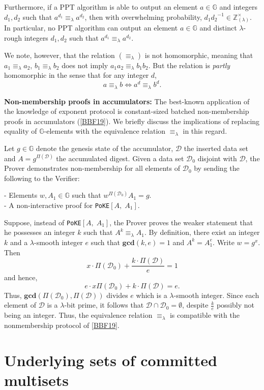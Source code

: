 \documentclass[11pt, lettersize, notitlepage, leqno, footskip=0.6cm]{article}
\newcommand{\bz}{\mathbb Z}
\newcommand{\LRA}{\Longleftrightarrow}
\newcommand{\eqlam}{\equiv_{\lam}}
\newcommand{\mc}{\mathcal}
\newcommand{\mb}{\mathbb}
\newcommand{\mbf}{\mathbf}
\newcommand{\lam}{\lambda}
\newcommand{\bzlam}{\bz_{(\lam)}}
\newcommand{\vs}{\vspace{-0.15cm}}
\newcommand{\noin}{\noindent}
\newcommand{\op}{overwhelming probability}
\newcommand{\GCD}{\mbf{gcd}}
\numberwithin{equation}{section}
\begin{document}
{{{Furthermore, if a PPT algorithm is able to output an element $a\in\mb{G}$ and integers $d_1,d_2$ such that $a^{d_1}\eqlam a^{d_2}$, then with \op, ${d_1}{d_2}^{-1}\in\bzlam^{\times}$. In particular, no PPT algorithm can output an element $a\in \mb{G}$ and distinct $\lam$-rough integers $d_1,d_2$ such that $a^{d_1}\eqlam a^{d_2}$.

We note, however, that the relation $(\equiv_{\lam})$ is not homomorphic, meaning that $a_1 \equiv_{\lam} a_2$, $b_1 \equiv_{\lam} b_2$ does not imply $a_1a_2 \eqlam b_1b_2$. But the relation is \textit{partly} homomorphic in the sense that for any integer $d$, \vs $$ a \equiv_{\lam} b \LRA a^d \equiv_{\lam} b^d .$$ 


\noin \textbf{Non-membership proofs in accumulators:} The  best-known application of the knowledge of exponent protocol is constant-sized batched non-membership proofs in accumulators (\hyperlink{BBF19}{[BBF19]}). We briefly discuss the implications of replacing equality of $\mb{G}$-elements with the equivalence relation $\eqlam$ in this regard. 

Let $g \in \mb{G}$ denote the genesis state of the accumulator, $\mc{D}$ the inserted data set and $A = g^{\Pi(\mc{D})}$ the accumulated digest. Given a data set $\mc{D}_0$ disjoint with $\mc{D}$, the Prover demonstrates non-membership for all elements of $\mc{D}_0$ by sending the following to the Verifier:

\noin - Elements $w, A_1\in\mb{G}$ such that $w^{\Pi(\mc{D}_0)}A_1 = g$.\\
- A non-interactive proof for \verb|PoKE|$[A,\; A_1]$.

Suppose, instead of \verb|PoKE|$[A,\; A_1]$, the Prover proves the weaker statement that he possesses an integer $k$ such that $A^k \eqlam A_1$. By definition, there exist an integer $k$ and a $\lam$-smooth integer $e$ such that $\GCD(k,e) = 1$ and $A^{k} = A_1^e$. Write $w = g^x$. Then \vs $$ x\cdot  \Pi(\mc{D}_0) +  \frac{k\cdot\Pi(\mc{D})}{e} = 1 $$ and hence, \vs $$e\cdot x \Pi(\mc{D}_0) +  k\cdot\Pi(\mc{D}) = e .$$ Thus, $\GCD(\Pi(\mc{D}_0), \Pi(\mc{D}))$ divides $e$ which is a $\lam$-smooth integer. Since each element of $\mc{D}$ is a $\lam$-bit prime, it follows that $\mc{D}\cap \mc{D}_0 = \emptyset$, despite $\frac{k}{e}$ possibly not being an integer. Thus, the equivalence relation $\eqlam$ is compatible with the nonmembership protocol of \hyperlink{BBF19}{[BBF19]}.



\section{\fontsize{11}{11}\selectfont Underlying sets of committed multisets}

}}}
\end{document}

